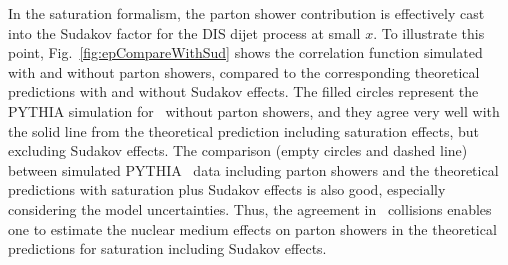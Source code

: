 In the saturation formalism, the parton shower contribution is effectively cast
into the Sudakov factor for the DIS dijet process at small $x$. To illustrate this
point, Fig.~\ref{fig:epCompareWithSud} shows the correlation function simulated
with and without parton showers, compared to the corresponding theoretical
predictions with and without Sudakov effects. The filled circles represent the PYTHIA
simulation for \ep\ without parton showers, and they agree very well with the solid
line from the theoretical prediction including saturation effects, but excluding
Sudakov effects. The comparison (empty circles and dashed line) between simulated PYTHIA \ep\
data including parton showers and the theoretical predictions with
saturation plus Sudakov effects is also good, especially considering the model
uncertainties. Thus, the agreement in \ep\ collisions enables one to estimate the
nuclear medium effects on parton showers in the theoretical predictions for
saturation including Sudakov effects.

